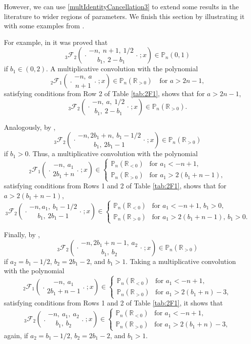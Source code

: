 \documentclass[reqno,11pt]{amsart}
\theoremstyle{remark}
\renewcommand{\P}{\mathbb{P}}
\newcommand{\R}{\mathbb{R}}
\newcommand*\pFq[5]{%
 {\ }_{#1}{\mathcal F}_{#2}{\left(\genfrac..{0pt}{}{#3}{#4};#5\right)}%
}
\begin{document}
However, we can use \eqref{multIdentityCancellation3} to extend some results in the literature to wider regions of parameters. We finish this section by illustrating it with some examples from \cite{Driver/Jordaan}.

For example, in \cite[Theorem 3.6]{Driver/Jordaan} it was proved  that
$$
\pFq{3}{2}{-n,\ n+1, \ 1/2}{b_1,\ 2-b_1}{x} \in \P_n(0,1)
$$
if $b_1\in (0,2)$. A multiplicative convolution with the polynomial
$$
\pFq{2}{1}{-n, \ a }{n+1 }{x}\in \P_n(\R_{>0})  \quad \text{for } a>2n-1,
$$
satisfying conditions from Row 2 of Table \ref{tab:2F1}, shows that for $a>2n-1$, 
$$
\pFq{3}{2}{-n,\ a, \ 1/2}{b_1,\ 2-b_1}{x} \in \P_n(\R_{>0}).
$$

Analogously, by \cite[Theorem 3.3]{Driver/Jordaan},
$$
\pFq{3}{2}{-n,2b_1+n, \ b_1-1/2}{b_1,\ 2b_1-1}{x} \in \P_n(\R_{>0})
$$
if $b_1>0$. Thus, a multiplicative convolution with the polynomial
$$
\pFq{2}{1}{-n, \ a_1 }{2b_1+n }{x}\in \begin{cases}
     \P_n(\R_{<0})  &\text{for }    a_1 < -n+1, \\
    \P_n(\R_{>0})  &\text{for }    a_1>2(b_1+n-1),
     \end{cases}
$$
satisfying conditions from Rows 1 and 2 of Table \ref{tab:2F1}, shows that for $ a>2(b_1+n-1)$, 
$$
\pFq{3}{2}{-n,a_1, \ b_1-1/2}{b_1,\ 2b_1-1}{x} \in 
\begin{cases}
     \P_n(\R_{<0})  &\text{for }    a_1 < -n+1, \, b_1>0,\\
    \P_n(\R_{>0})  &\text{for }    a_1 >2(b_1+n-1), \, b_1>0.
     \end{cases}
$$
 
Finally, by \cite[Theorem 3.4]{Driver/Jordaan},
$$
\pFq{3}{2}{-n,  2b_1+n-1, \ a_2}{b_1,\ b_2}{x} \in \P_n(\R_{>0}) 
$$
if $a_2=b_1-1/2$, $b_2=2b_1-2$, and $b_1>1$. 
Taking a multiplicative convolution with the polynomial
$$
\pFq{2}{1}{-n, \ a_1 }{2b_1+n-1 }{x}\in \begin{cases}
     \P_n(\R_{<0})  &\text{for }    a_1 < -n+1, \\
    \P_n(\R_{>0})  &\text{for }    a_1 >2(b_1+n)-3,
     \end{cases}
$$
satisfying conditions from Rows 1 and 2 of Table \ref{tab:2F1}, it shows that
$$
\pFq{3}{2}{-n,\ a_1, \ a_2}{b_1,\ b_2}{x} \in \begin{cases}
     \P_n(\R_{<0})  &\text{for }    a_1 < -n+1, \\
    \P_n(\R_{>0})  &\text{for }    a_1>2(b_1+n)-3,
     \end{cases}
$$
again, if $a_2=b_1-1/2$, $b_2=2b_1-2$, and $b_1>1$.
\end{document}
